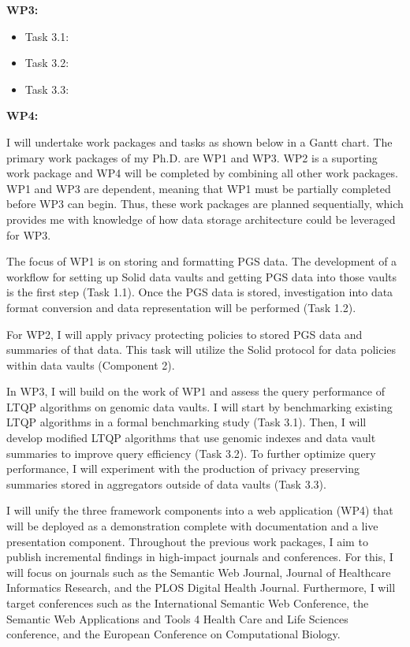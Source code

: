 \documentclass[a4paper,11pt]{article}
\begin{document}
\begin{refsection}
\begin{adjustwidth}{0cm}{0cm}
	\textbf{WP3:      \WPc  {}}
	\begin{itemize}
	  \item Task 3.1: \WPca {}
	  \item Task 3.2: \WPcb {}
	  \item Task 3.3: \WPcc {}
	\end{itemize}
	\smallskip
	
	\textbf{WP4:      \WPd  {}}
\end{adjustwidth}

\noindent
I will undertake work packages and tasks as shown below in a Gantt chart.
The primary work packages of my Ph.D. are WP1 and WP3.
WP2 is a suporting work package and WP4 will be completed by combining all other work packages.
WP1 and WP3 are dependent, meaning that WP1 must be partially completed before WP3 can begin.
Thus, these work packages are planned sequentially, which provides me with knowledge of how data storage architecture could be leveraged for WP3.

The focus of WP1 is on storing and formatting PGS data.
The development of a workflow for setting up Solid data vaults and getting PGS data into those vaults is the first step (Task 1.1).
Once the PGS data is stored, investigation into data format conversion and data representation will be performed (Task 1.2).

For WP2, I will apply privacy protecting policies to stored PGS data and summaries of that data.
This task will utilize the Solid protocol for data policies within data vaults (Component 2).

In WP3, I will build on the work of WP1 and assess the query performance of LTQP algorithms on genomic data vaults.
I will start by benchmarking existing LTQP algorithms in a formal benchmarking study (Task 3.1).
Then, I will develop modified LTQP algorithms that use genomic indexes and data vault summaries to improve query efficiency (Task 3.2).
To further optimize query performance, I will experiment with the production of privacy preserving summaries stored in aggregators outside of data vaults (Task 3.3).

I will unify the three framework components into a web application (WP4) that will be deployed as a demonstration complete with documentation and a live presentation component. 
Throughout the previous work packages, I aim to publish incremental findings in high-impact journals and conferences.
For this, I will focus on journals such as the Semantic Web Journal, Journal of Healthcare Informatics Research, and the PLOS Digital Health Journal.
Furthermore, I will target conferences such as the International Semantic Web Conference, the Semantic Web Applications and Tools 4 Health Care and Life Sciences conference, and the European Conference on Computational Biology.


\end{refsection}
\end{document}
